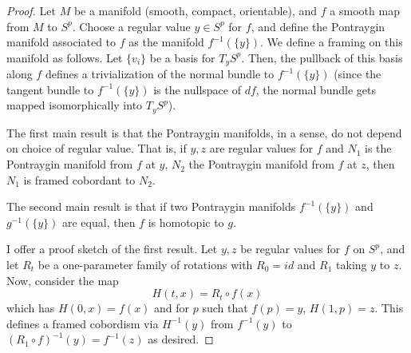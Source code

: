 \documentclass[fontsize=11pt]{scrartcl} %
\numberwithin{equation}{section} %
\numberwithin{figure}{section} %
\numberwithin{table}{section} %
\begin{document}
\begin{proof}
    Let $M$ be a manifold (smooth, compact, orientable), and $f$ a
    smooth map from $M$ to $S^p$. Choose a regular value $y\in S^p$ for $f$, and
    define the Pontraygin manifold associated to $f$ as the manifold
    $f^{-1}(\{y\})$. We define a framing on this manifold as follows. Let
    $\{v_i\}$ be a basis for $T_yS^p$. Then, the pullback of this basis along
    $f$ defines a trivialization of the normal bundle to $f^{-1}(\{y\})$ (since
        the tangent bundle to $f^{-1}(\{y\})$ is the nullspace of $df$, the
    normal bundle gets mapped isomorphically into $T_yS^p$).
    
    The first main result is that the Pontraygin manifolds, in a sense, do not
    depend on choice of regular value. That is, if $y,z$ are regular values for
    $f$ and $N_1$ is the Pontraygin
    manifold from $f$ at $y$, $N_2$ the Pontraygin manifold from $f$ at $z$,
    then $N_1$ is framed cobordant to $N_2$. 

    The second main result is that if two Pontraygin manifolds $f^{-1}(\{y\})$
    and $g^{-1}(\{y\})$ are equal, then $f$ is homotopic to $g$.

    I offer a proof sketch of the first result. Let $y,z$ be regular values for
    $f$ on $S^p$, and let $R_t$ be a one-parameter family of rotations with
    $R_0=id$ and $R_1$ taking $y$ to $z$. Now, consider the map
    \[
        H(t,x) = R_t\circ f(x)
    \]
    which has $H(0,x)=f(x)$ and for $p$ such that $f(p) = y$, $H(1,p) = z$. This
    defines a framed cobordism via $H^{-1}(y)$ from $f^{-1}(y)$ to $(R_1\circ
    f)^{-1}(y) = f^{-1}(z)$ as desired.

\end{proof}
\end{document}
